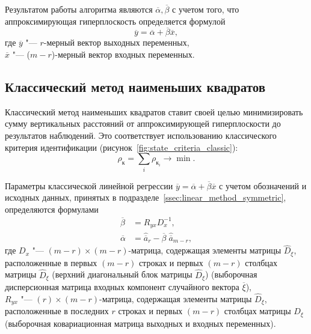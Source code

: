 Результатом работы алгоритма являются \( \overline{\alpha}, \overline{\beta} \) с учетом того,
что аппроксимирующая гиперплоскость определяется формулой
\[ \overline{y} = \overline{\alpha} + \overline{\beta} \overline{x}, \]
где \( \overline{y} \) "--- \( r \)-мерный вектор выходных переменных, \\
\hspace*{7mm} \( \overline{x} \) "--- (\( m - r \))-мерный вектор входных переменных.

\pagebreak
\subsection{Классический метод наименьших квадратов}

Классический метод наименьших квадратов ставит своей целью минимизировать сумму
вертикальных расстояний от аппроксимирующей гиперплоскости до результатов наблюдений.
Это соответствует использованию классического критерия идентификации
(рисунок~\ref{fig:state_criteria_classic}):
\begin{equation*}
  \rho_{\text{к}} = \sum_i \rho_{\text{к}_i} \rightarrow \min.
\end{equation*}

Параметры классической линейной регрессии
\( \overline{y} = \overline{\alpha} + \overline{\beta} \overline{x} \)
с учетом обозначений и исходных данных, принятых в подразделе~\ref{ssec:linear_method_symmetric},
определяются формулами
\begin{equation*}
  \begin{aligned}
    \overline{\beta} &= R_{yx} D^{-1}_{x}, \\
    \overline{\alpha} &= \hat{\overline{a}}_{r} - \overline{\beta} \; \hat{\overline{a}}_{m-r},
  \end{aligned}
\end{equation*}
где \( D_x \) "--- \( (m-r) \times (m-r) \)-матрица, содержащая элементы матрицы \( \hat{D}_{\xi} \),
расположенные в первых \( (m-r) \) строках и первых \( (m-r) \) столбцах матрицы \( \hat{D}_{\xi} \)
(верхний диагональный блок матрицы \( \hat{D}_{\xi} \))
(выборочная дисперсионная матрица входных компонент случайного вектора \( \overline{\xi} \)), \\
\hspace*{7mm} \( R_{yx} \) "--- \( (r) \times (m-r) \)-матрица, содержащая элементы матрицы
\( \hat{D}_{\xi} \), расположенные в последних \( r \) строках и первых \( (m-r) \) столбцах
матрицы \( D_{\xi} \) (выборочная ковариационная матрица выходных и входных переменных).



